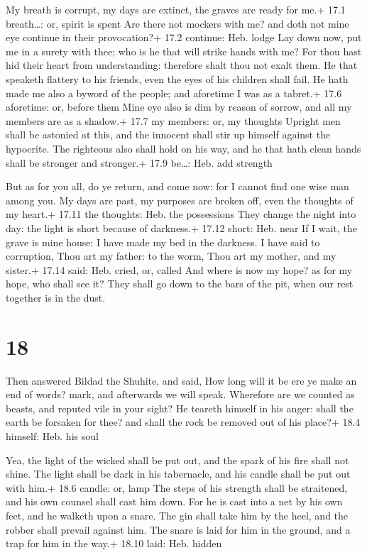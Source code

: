  My breath is corrupt, my days are extinct, the graves are
ready for me.+ 17.1 breath\ldots: or, spirit is spent  Are
there not mockers with me? and doth not mine eye continue in their
provocation?+ 17.2 continue: Heb. lodge  Lay down now, put
me in a surety with thee; who is he that will strike hands with me?
 For thou hast hid their heart from understanding: therefore
shalt thou not exalt them.  He that speaketh flattery to his
friends, even the eyes of his children shall fail.  He hath
made me also a byword of the people; and aforetime I was as a tabret.+
17.6 aforetime: or, before them  Mine eye also is dim by
reason of sorrow, and all my members are as a shadow.+ 17.7 my members:
or, my thoughts  Upright men shall be astonied at this, and
the innocent shall stir up himself against the hypocrite. 
The righteous also shall hold on his way, and he that hath clean hands
shall be stronger and stronger.+ 17.9 be\ldots: Heb. add strength

 But as for you all, do ye return, and come now: for I
cannot find one wise man among you.  My days are past, my
purposes are broken off, even the thoughts of my heart.+ 17.11 the
thoughts: Heb. the possessions  They change the night into
day: the light is short because of darkness.+ 17.12 short: Heb. near
 If I wait, the grave is mine house: I have made my bed in
the darkness.  I have said to corruption, Thou art my
father: to the worm, Thou art my mother, and my sister.+ 17.14 said:
Heb. cried, or, called  And where is now my hope? as for my
hope, who shall see it?  They shall go down to the bars of
the pit, when our rest together is in the dust.

\hypertarget{section-17}{%
\section{18}\label{section-17}}

 Then answered Bildad the Shuhite, and said, 
How long will it be ere ye make an end of words? mark, and afterwards we
will speak.  Wherefore are we counted as beasts, and reputed
vile in your sight?  He teareth himself in his anger: shall
the earth be forsaken for thee? and shall the rock be removed out of his
place?+ 18.4 himself: Heb. his soul

 Yea, the light of the wicked shall be put out, and the
spark of his fire shall not shine.  The light shall be dark
in his tabernacle, and his candle shall be put out with him.+ 18.6
candle: or, lamp  The steps of his strength shall be
straitened, and his own counsel shall cast him down.  For he
is cast into a net by his own feet, and he walketh upon a snare.
 The gin shall take him by the heel, and the robber shall
prevail against him.  The snare is laid for him in the
ground, and a trap for him in the way.+ 18.10 laid: Heb. hidden

